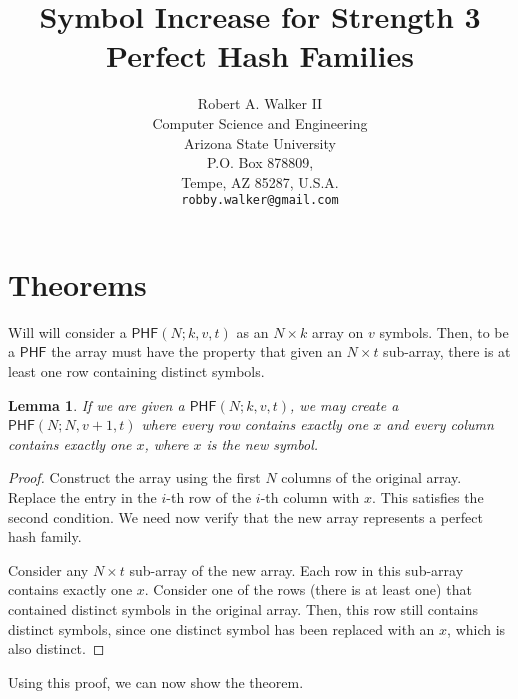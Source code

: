 \documentclass[10pt]{article}
\newcommand{\PHF}{\mbox{$\mathsf{PHF}$}}
\newtheorem{lemma}{Lemma}[section]
\begin{document}
\title{Symbol Increase for Strength 3 Perfect Hash Families}

\author{Robert A. Walker II\\
Computer Science and Engineering\\
Arizona State University\\
P.O. Box 878809,\\
Tempe, AZ 85287, U.S.A.\\
{\tt robby.walker@gmail.com}
}
\date{}

\maketitle


\section{Theorems}

Will will consider a $\PHF(N;k,v,t)$ as an $N \times k$ array on $v$ symbols.
Then, to be a $\PHF$ the array must have the property that given an $N \times t$
sub-array, there is at least one row containing distinct symbols.

\begin{lemma}
If we are given a $\PHF(N;k,v,t)$, we may create a $\PHF(N;N,v+1,t)$ where every row contains
exactly one $x$ and every column contains exactly one $x$, where $x$ is the new symbol.
\end{lemma}

\begin{proof}
Construct the array using the first $N$ columns of the original array.  Replace the entry in the $i$-th row of the
$i$-th column with $x$.  This satisfies the second condition.  We need now verify that the new array represents a
perfect hash family.

Consider any $N \times t$ sub-array of the new array.  Each row in this sub-array contains exactly one $x$.  Consider
one of the rows (there is at least one) that contained distinct symbols in the original array.  Then, this row still
contains distinct symbols, since one distinct symbol has been replaced with an $x$, which is also distinct.
\end{proof}

Using this proof, we can now show the theorem.
\end{document}
